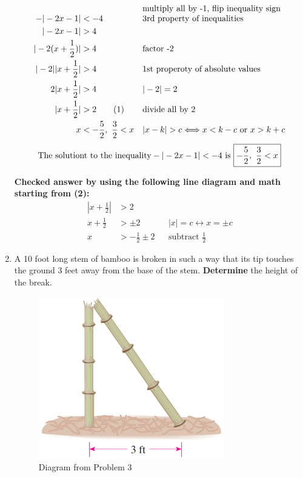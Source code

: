 \documentclass[12pt]{book}
\newcommand\numberthis{\addtocounter{equation}{1}\tag{\theequation}}
\begin{document}
\begin{enumerate}
\addtolength{\jot}{0.5em}
\begin{align*}
    -|-2x-1| & < -4 && \text{\shortstack[l]{multiply all by -1, flip inequality sign \\ 3rd property of inequalities}} \\
    |-2x-1| & > 4 \\
    |-2(x+\frac{1}{2})| & > 4 && \text{factor -2} \\
    |-2||x+\frac{1}{2}| & > 4 && \text{1st properoty of absolute values} \\
    2|x+\frac{1}{2}| & > 4 && |-2| = 2 \\
    |x+\frac{1}{2}| & > 2  \numberthis && \text{divide all by 2} \\
    x & < -\frac{5}{2}, \text{\space} \frac{3}{2} < x && |x-k| > c \Longleftrightarrow x < k-c \text{ or } x > k+c
\end{align*}
$$ \text{The solutiont to the inequality} -|-2x-1| < -4 \text{ is } \boxed{-\frac{5}{2}, \text{\space} \frac{3}{2} < x} $$

\vspace{0.5em}
\textbf{Checked answer by using the following line diagram and math starting from (2):}
\addtolength{\jot}{0em}
\begin{align*}
    |x+\frac{1}{2}| & > 2 \\
    x+\frac{1}{2} & > \pm 2 && |x| = c \longleftrightarrow x = \pm c \\
    x & > -\frac{1}{2} \pm 2 && \text{subtract } \frac{1}{2} \text{ }
\end{align*}

\newpage

\item A 10 foot long stem of bamboo is broken in such a way that its tip touches the ground 3 feet away from the base of the stem. \textbf{Determine} the height of the break.


\begin{figure}[h]
\centering
\includegraphics{bamboo.png}
\caption{Diagram from Problem 3}
\end{figure} 


\end{enumerate}
\end{document}

